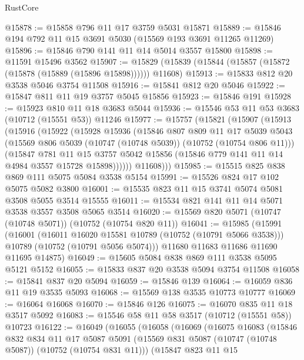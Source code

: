 \begin{lexlean}{RustCore}
\begin{coremodule}
@15878 := @15858 @796 @11 @17 @3759 @5031 @15871
@15889 := @15846 @194 @792 @11 @15 @3691 @5030 (@15569 @193 @3691 @11265 @11269)
@15896 := @15846 @790 @141 @11 @14 @5014 @3557 @15800
@15898 := @11591 @15496 @3562
@15907 := @15829 (@15839 (@15844 (@15857 (@15872 (@15878 (@15889 (@15896 @15898)))))) @11608)
@15913 := @15833 @812 @20 @3538 @5046 @3754 @11508
@15916 := @15841 @812 @20 @5046
@15922 := @15847 @811 @11 @19 @3757 @5045 @15856
@15923 := @15846 @191
@15928 := @15923 @810 @11 @18 @3683 @5044
@15936 := @15546 @53 @11 @53 @3683 (@10712 (@15551 @53)) @11246
@15977 := @15757
    (@15821
      (@15907
        (@15913
          (@15916
            (@15922
              (@15928
                @15936
                (@15846
                  @807
                  @809
                  @11
                  @17
                  @5039
                  @5043
                  (@15569 @806 @5039 (@10747 (@10748 @5039)) (@10752 (@10754 @806 @11)))
                  (@15847
                    @781
                    @11
                    @15
                    @3757
                    @5042
                    @15856
                    (@15846 @779 @141 @11 @14 @4984 @3557 @15728 @15898))))))
          @11608)))
@15985 := @15515 @825 @838 @869 @111 @5075 @5084 @3538 @5154
@15991 := @15526 @824 @17 @102 @5075 @5082 @3800
@16001 := @15535 @823 @11 @15 @3741 @5074 @5081 @3508 @5055 @3514 @15555
@16011 := @15534 @821 @141 @11 @14 @5071 @3538 @3557 @3508 @5065 @3514
@16020 := @15569 @820 @5071 (@10747 (@10748 @5071)) (@10752 (@10754 @820 @11))
@16041 := @15985
    (@15991
      (@16001
        (@16011 @16020 @15581 @10789 (@10752 (@10791 @5066 @3538)))
        @10789
        (@10752 (@10791 @5056 @5074)))
      @11680
      @11683
      @11686
      @11690
      @11695
      @14875)
@16049 := @15605 @5084 @838 @869 @111 @3538 @5095 @5121 @5152
@16055 := @15833 @837 @20 @3538 @5094 @3754 @11508
@16058 := @15841 @837 @20 @5094
@16059 := @15846 @139
@16064 := @16059 @836 @11 @19 @3535 @5093
@16068 := @15569 @138 @3535 @10773 @10777
@16069 := @16064 @16068
@16070 := @15846 @126
@16075 := @16070 @835 @11 @18 @3517 @5092
@16083 := @15546 @58 @11 @58 @3517 (@10712 (@15551 @58)) @10723
@16122 := @16049
    (@16055
      (@16058
        (@16069
          (@16075
            @16083
            (@15846
              @832
              @834
              @11
              @17
              @5087
              @5091
              (@15569 @831 @5087 (@10747 (@10748 @5087)) (@10752 (@10754 @831 @11)))
              (@15847
                @823
                @11
                @15

\end{coremodule}
\end{lexlean}
